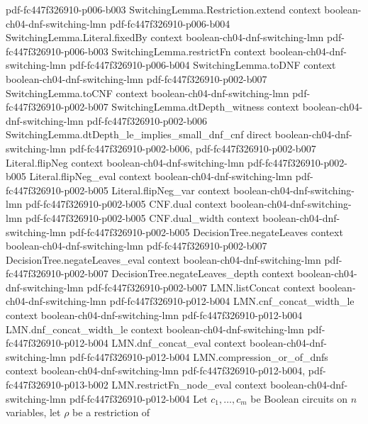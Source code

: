\begin{lemma}
  {pdf-fc447f326910-p006-b003}
\proofstep
  {SwitchingLemma.Restriction.extend}
  {context}
  {boolean-ch04-dnf-switching-lmn}
  {pdf-fc447f326910-p006-b004}
\proofstep
  {SwitchingLemma.Literal.fixedBy}
  {context}
  {boolean-ch04-dnf-switching-lmn}
  {pdf-fc447f326910-p006-b003}
\proofstep
  {SwitchingLemma.restrictFn}
  {context}
  {boolean-ch04-dnf-switching-lmn}
  {pdf-fc447f326910-p006-b004}
\proofstep
  {SwitchingLemma.toDNF}
  {context}
  {boolean-ch04-dnf-switching-lmn}
  {pdf-fc447f326910-p002-b007}
\proofstep
  {SwitchingLemma.toCNF}
  {context}
  {boolean-ch04-dnf-switching-lmn}
  {pdf-fc447f326910-p002-b007}
\proofstep
  {SwitchingLemma.dtDepth_witness}
  {context}
  {boolean-ch04-dnf-switching-lmn}
  {pdf-fc447f326910-p002-b006}
\proofstep
  {SwitchingLemma.dtDepth_le_implies_small_dnf_cnf}
  {direct}
  {boolean-ch04-dnf-switching-lmn}
  {pdf-fc447f326910-p002-b006,
    pdf-fc447f326910-p002-b007}
\proofstep
  {Literal.flipNeg}
  {context}
  {boolean-ch04-dnf-switching-lmn}
  {pdf-fc447f326910-p002-b005}
\proofstep
  {Literal.flipNeg_eval}
  {context}
  {boolean-ch04-dnf-switching-lmn}
  {pdf-fc447f326910-p002-b005}
\proofstep
  {Literal.flipNeg_var}
  {context}
  {boolean-ch04-dnf-switching-lmn}
  {pdf-fc447f326910-p002-b005}
\proofstep
  {CNF.dual}
  {context}
  {boolean-ch04-dnf-switching-lmn}
  {pdf-fc447f326910-p002-b005}
\proofstep
  {CNF.dual_width}
  {context}
  {boolean-ch04-dnf-switching-lmn}
  {pdf-fc447f326910-p002-b005}
\proofstep
  {DecisionTree.negateLeaves}
  {context}
  {boolean-ch04-dnf-switching-lmn}
  {pdf-fc447f326910-p002-b007}
\proofstep
  {DecisionTree.negateLeaves_eval}
  {context}
  {boolean-ch04-dnf-switching-lmn}
  {pdf-fc447f326910-p002-b007}
\proofstep
  {DecisionTree.negateLeaves_depth}
  {context}
  {boolean-ch04-dnf-switching-lmn}
  {pdf-fc447f326910-p002-b007}
\proofstep
  {LMN.listConcat}
  {context}
  {boolean-ch04-dnf-switching-lmn}
  {pdf-fc447f326910-p012-b004}
\proofstep
  {LMN.cnf_concat_width_le}
  {context}
  {boolean-ch04-dnf-switching-lmn}
  {pdf-fc447f326910-p012-b004}
\proofstep
  {LMN.dnf_concat_width_le}
  {context}
  {boolean-ch04-dnf-switching-lmn}
  {pdf-fc447f326910-p012-b004}
\proofstep
  {LMN.dnf_concat_eval}
  {context}
  {boolean-ch04-dnf-switching-lmn}
  {pdf-fc447f326910-p012-b004}
\proofstep
  {LMN.compression_or_of_dnfs}
  {context}
  {boolean-ch04-dnf-switching-lmn}
  {pdf-fc447f326910-p012-b004,
    pdf-fc447f326910-p013-b002}
\proofstep
  {LMN.restrictFn_node_eval}
  {context}
  {boolean-ch04-dnf-switching-lmn}
  {pdf-fc447f326910-p012-b004}
Let $c_1,\dots,c_m$ be Boolean circuits on $n$ variables, let $\rho$ be a restriction of

\end{lemma}

